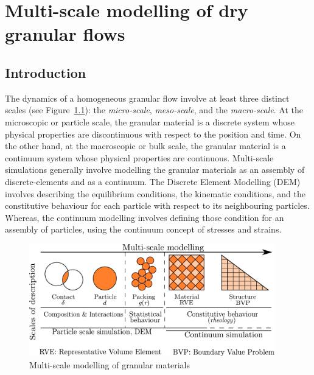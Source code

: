 \chapter{Multi-scale modelling of dry granular flows}

\ifpdf
    \graphicspath{{Chapter4/figs/raster/}{Chapter4/figs/pdf/}{Chapter4/figs/}}
\else
    \graphicspath{{Chapter4/figs/vector/}{Chapter4/figs/}}
\fi

\section{Introduction}

The dynamics of a homogeneous granular flow involve at least three distinct 
scales (see Figure~\ref{fig:multiscale}): the \textit{micro-scale}, 
\textit{meso-scale}, and the \textit{macro-scale}. At the microscopic or 
particle scale, the granular material is a discrete system whose physical 
properties are discontinuous with respect to the position and time. On the 
other hand, at the macroscopic or bulk scale, the granular material is a 
continuum system whose physical properties are continuous. Multi-scale 
simulations generally involve modelling the granular materials as an assembly 
of discrete-elements and as a continuum. The Discrete Element Modelling (DEM) 
involves describing the equilibrium conditions, the kinematic conditions, and 
the constitutive behaviour for each particle with respect to its neighbouring 
particles. Whereas, the continuum modelling involves defining those condition 
for an assembly of particles, using the continuum concept of stresses and 
strains.

\begin{figure}[htbp]
\centering
\includegraphics[width=0.95\textwidth]{multiscale}
\caption{Multi-scale modelling of granular materials}
\label{fig:multiscale}
\end{figure}

